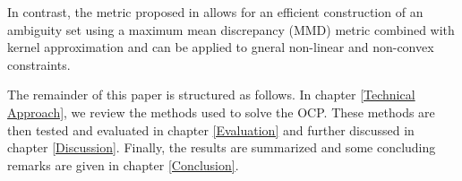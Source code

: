 In contrast, the metric proposed in \cite{Yassine_22} allows for an efficient construction of an ambiguity set using a maximum mean discrepancy (MMD) metric combined with kernel approximation and can be applied to gneral non-linear and non-convex constraints.

The remainder of this paper is structured as follows. In chapter \ref{Technical Approach}, we review the methods used to solve the OCP. These methods are then tested and evaluated in chapter \ref{Evaluation} and further discussed in chapter \ref{Discussion}. Finally, the results are summarized and some concluding remarks are given in chapter \ref{Conclusion}.



